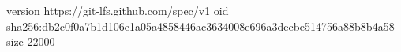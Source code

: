 version https://git-lfs.github.com/spec/v1
oid sha256:db2c0f0a7b1d106e1a05a4858446ac3634008e696a3decbe514756a88b8b4a58
size 22000
